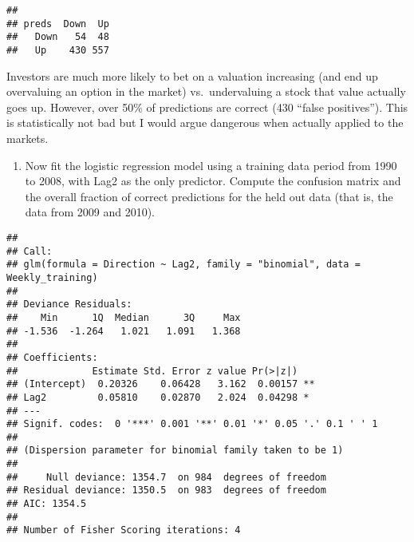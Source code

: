 \documentclass[]{article}
\newenvironment{Shaded}{\begin{snugshade}}{\end{snugshade}}
\newcommand{\KeywordTok}[1]{\textcolor[rgb]{0.13,0.29,0.53}{\textbf{#1}}}
\newcommand{\DataTypeTok}[1]{\textcolor[rgb]{0.13,0.29,0.53}{#1}}
\newcommand{\DecValTok}[1]{\textcolor[rgb]{0.00,0.00,0.81}{#1}}
\newcommand{\StringTok}[1]{\textcolor[rgb]{0.31,0.60,0.02}{#1}}
\newcommand{\CommentTok}[1]{\textcolor[rgb]{0.56,0.35,0.01}{\textit{#1}}}
\newcommand{\OperatorTok}[1]{\textcolor[rgb]{0.81,0.36,0.00}{\textbf{#1}}}
\newcommand{\NormalTok}[1]{#1}
\providecommand{\tightlist}{%
  \setlength{\itemsep}{0pt}\setlength{\parskip}{0pt}}
\begin{document}
\begin{verbatim}
##       
## preds  Down  Up
##   Down   54  48
##   Up    430 557
\end{verbatim}

Investors are much more likely to bet on a valuation increasing (and end
up overvaluing an option in the market) vs.~undervaluing a stock that
value actually goes up. However, over 50\% of predictions are correct
(430 ``false positives''). This is statistically not bad but I would
argue dangerous when actually applied to the markets.

\begin{enumerate}
\def\labelenumi{(\alph{enumi})}
\setcounter{enumi}{3}
\tightlist
\item
  Now fit the logistic regression model using a training data period
  from 1990 to 2008, with Lag2 as the only predictor. Compute the
  confusion matrix and the overall fraction of correct predictions for
  the held out data (that is, the data from 2009 and 2010).
\end{enumerate}

\begin{Shaded}
\end{Shaded}

\begin{verbatim}
## 
## Call:
## glm(formula = Direction ~ Lag2, family = "binomial", data = Weekly_training)
## 
## Deviance Residuals: 
##    Min      1Q  Median      3Q     Max  
## -1.536  -1.264   1.021   1.091   1.368  
## 
## Coefficients:
##             Estimate Std. Error z value Pr(>|z|)   
## (Intercept)  0.20326    0.06428   3.162  0.00157 **
## Lag2         0.05810    0.02870   2.024  0.04298 * 
## ---
## Signif. codes:  0 '***' 0.001 '**' 0.01 '*' 0.05 '.' 0.1 ' ' 1
## 
## (Dispersion parameter for binomial family taken to be 1)
## 
##     Null deviance: 1354.7  on 984  degrees of freedom
## Residual deviance: 1350.5  on 983  degrees of freedom
## AIC: 1354.5
## 
## Number of Fisher Scoring iterations: 4
\end{verbatim}
\end{document}
